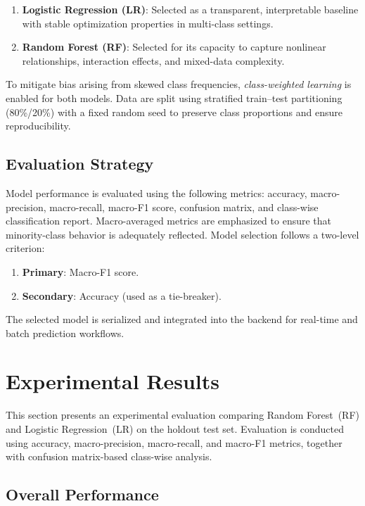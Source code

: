 \documentclass[conference]{IEEEtran}
\begin{document}
\begin{enumerate}[leftmargin=*]
    \item \textbf{Logistic Regression (LR)}: Selected as a transparent, interpretable baseline with stable optimization properties in multi-class settings.
    \item \textbf{Random Forest (RF)}: Selected for its capacity to capture nonlinear relationships, interaction effects, and mixed-data complexity.
\end{enumerate}

To mitigate bias arising from skewed class frequencies, \emph{class-weighted learning} is enabled for both models. Data are split using stratified train--test partitioning (80\%/20\%) with a fixed random seed to preserve class proportions and ensure reproducibility.

\subsection{Evaluation Strategy}

Model performance is evaluated using the following metrics: accuracy, macro-precision, macro-recall, macro-F1 score, confusion matrix, and class-wise classification report. Macro-averaged metrics are emphasized to ensure that minority-class behavior is adequately reflected. Model selection follows a two-level criterion:
\begin{enumerate}[leftmargin=*]
    \item \textbf{Primary}: Macro-F1 score.
    \item \textbf{Secondary}: Accuracy (used as a tie-breaker).
\end{enumerate}
The selected model is serialized and integrated into the backend for real-time and batch prediction workflows.

\section{Experimental Results}

This section presents an experimental evaluation comparing Random Forest~(RF) and Logistic Regression~(LR) on the holdout test set. Evaluation is conducted using accuracy, macro-precision, macro-recall, and macro-F1 metrics, together with confusion matrix-based class-wise analysis.

\subsection{Overall Performance}
\end{document}

